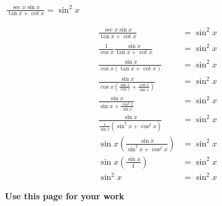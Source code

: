 \documentclass[addpoints]{exam}
\begin{document}
\begin{tcolorbox}[breakable, title=TRIG IDENTITIES, colframe=black, sharp corners, colback=white, colbacktitle=white, coltitle=black]
\begin{questions}
            \question \(\displaystyle\, \frac{\sec x \sin x}{\tan x + \cot x} = \sin^2 x\)
            \begin{solution}[\stretch{1}]
              \begin{align*}
                \frac{\sec x \sin x}{\tan x + \cot x} &= \sin^2 x \\ 
                \frac{1}{\cos x}\frac{\sin x}{\tan x + \cot x} &= \sin^2 x \\ 
                \frac{\sin x}{\cos x\left(\tan x + \cot x\right)} &= \sin^2 x \\ 
                \frac{\sin x}{\cos x \left(\frac{\sin x}{\cos x} + \frac{\cos x}{\sin x}\right)}& = \sin^2 x \\ 
                \frac{\sin x}{\sin x + \frac{\cos^2 x}{\sin x}} &= \sin^2 x \\ 
                \frac{\sin x}{\frac{1}{\sin x}\left(\sin^2 x + \cos^2 x\right)} &= \sin^2 x \\ 
                \sin x\left(\frac{\sin x}{\sin^2 x + \cos^2 x}\right) &= \sin^2 x \\ 
                \sin x\left(\frac{\sin x}{1}\right) &= \sin^2 x \\ 
                \sin^2 x &= \sin^2 x
              \end{align*}
            \end{solution}
        \end{questions}
    \end{tcolorbox}
    \ifprintanswers
    \else 
    \newpage 
      \begin{center}
        \large\textbf{Use this page for your work}
      \end{center}
    \fi
\end{document}
